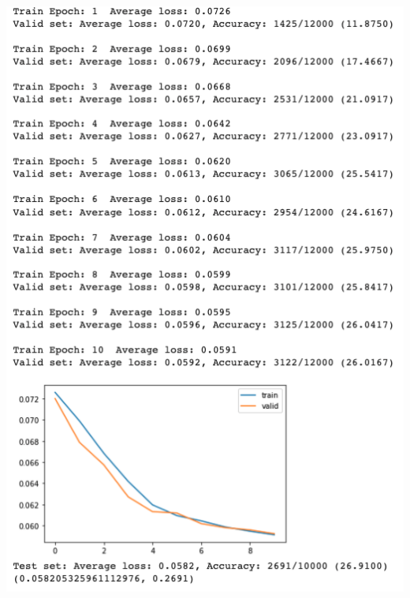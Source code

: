 \documentclass[11pt]{scrartcl}
\begin{document}
\begin{itemize}
\begin{center}
\includegraphics[scale=0.5]{2results.png}
\end{center}

\end{itemize}
\end{document}
